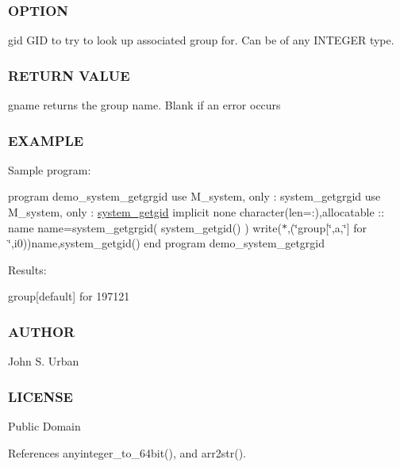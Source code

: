 \subsubsection*{O\+P\+T\+I\+ON}

gid G\+ID to try to look up associated group for. Can be of any I\+N\+T\+E\+G\+ER type.

\subsubsection*{R\+E\+T\+U\+RN V\+A\+L\+UE}

gname returns the group name. Blank if an error occurs

\subsubsection*{E\+X\+A\+M\+P\+LE}

Sample program\+:

program demo\+\_\+system\+\_\+getgrgid use M\+\_\+system, only \+: system\+\_\+getgrgid use M\+\_\+system, only \+: \mbox{\hyperlink{interfacem__system_1_1system__getgid}{system\+\_\+getgid}} implicit none character(len=\+:),allocatable \+:\+: name name=system\+\_\+getgrgid( system\+\_\+getgid() ) write($\ast$,\textquotesingle{}(\char`\"{}group\mbox{[}\char`\"{},a,\char`\"{}\mbox{]} for \char`\"{},i0)\textquotesingle{})name,system\+\_\+getgid() end program demo\+\_\+system\+\_\+getgrgid

Results\+:

group\mbox{[}default\mbox{]} for 197121

\subsubsection*{A\+U\+T\+H\+OR}

John S. Urban \subsubsection*{L\+I\+C\+E\+N\+SE}

Public Domain 

References anyinteger\+\_\+to\+\_\+64bit(), and arr2str().

